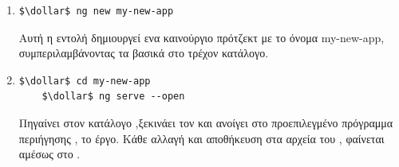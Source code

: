 \begin{enumerate}[label=\textbf{\arabic*}]
   \item 
	\begin{lstlisting}[language=command.com]
	$\dollar$ ng new my-new-app
	\end{lstlisting}
    
    Αυτή η εντολή δημιουργεί ενα καινούργιο πρότζεκτ με το όνομα \textlatin{my-new-app}, συμπεριλαμβάνοντας τα βασικά   στο τρέχον κατάλογο.
  \item 
   \begin{lstlisting}[language=command.com]
    $\dollar$ cd my-new-app
    $\dollar$ ng serve --open
    \end{lstlisting}
    Πηγαίνει στον κατάλογο  ,ξεκινάει τον  και ανοίγει στο προεπιλεγμένο πρόγραμμα περιήγησης , το έργο. Κάθε αλλαγή και αποθήκευση στα αρχεία του , φαίνεται αμέσως στο .
\end{enumerate}

